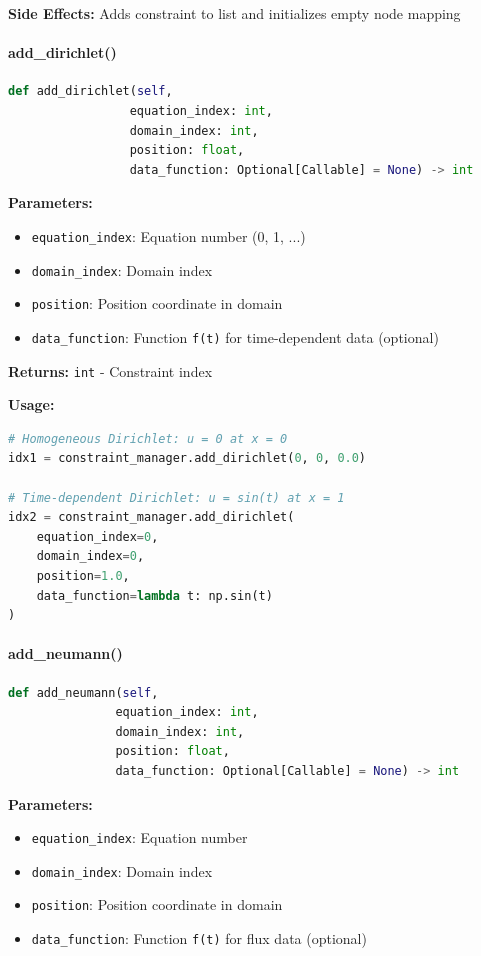 \textbf{Side Effects:} Adds constraint to list and initializes empty node mapping

\paragraph{add\_dirichlet()}\leavevmode
\begin{lstlisting}[language=Python, caption=Add Dirichlet Method]
def add_dirichlet(self, 
                 equation_index: int, 
                 domain_index: int, 
                 position: float,
                 data_function: Optional[Callable] = None) -> int
\end{lstlisting}

\textbf{Parameters:}
\begin{itemize}
    \item \texttt{equation\_index}: Equation number (0, 1, ...)
    \item \texttt{domain\_index}: Domain index
    \item \texttt{position}: Position coordinate in domain
    \item \texttt{data\_function}: Function \texttt{f(t)} for time-dependent data (optional)
\end{itemize}

\textbf{Returns:} \texttt{int} - Constraint index

\textbf{Usage:}
\begin{lstlisting}[language=Python, caption=Add Dirichlet Usage]
# Homogeneous Dirichlet: u = 0 at x = 0
idx1 = constraint_manager.add_dirichlet(0, 0, 0.0)

# Time-dependent Dirichlet: u = sin(t) at x = 1
idx2 = constraint_manager.add_dirichlet(
    equation_index=0,
    domain_index=0, 
    position=1.0,
    data_function=lambda t: np.sin(t)
)
\end{lstlisting}

\paragraph{add\_neumann()}\leavevmode
\begin{lstlisting}[language=Python, caption=Add Neumann Method]
def add_neumann(self, 
               equation_index: int, 
               domain_index: int, 
               position: float,
               data_function: Optional[Callable] = None) -> int
\end{lstlisting}

\textbf{Parameters:}
\begin{itemize}
    \item \texttt{equation\_index}: Equation number
    \item \texttt{domain\_index}: Domain index
    \item \texttt{position}: Position coordinate in domain
    \item \texttt{data\_function}: Function \texttt{f(t)} for flux data (optional)
\end{itemize}

